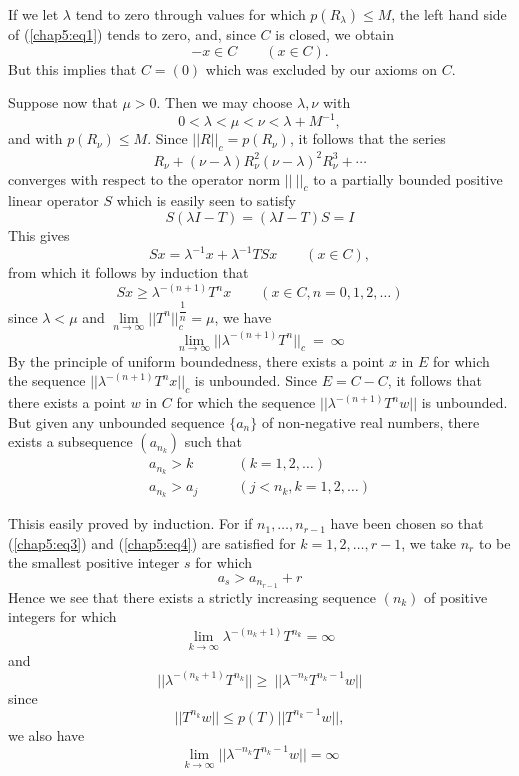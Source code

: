 If we let $\lambda$ tend to zero through values for which $p(R_
\lambda) \leq M$, the left hand side of (\ref{chap5:eq1}) tends to
zero, and, since $C$ is closed, we obtain  
$$
- x \in C \qquad (x \in C).
$$
But this implies that $C=(0)$ which was excluded by our axioms on
$C$. 

Suppose now that $\mu > 0$. Then we may choose $\lambda, \nu$ with 
$$
0 < \lambda < \mu < \nu < \lambda + M^{-1},
$$
and with $p(R_\nu) \leq M$. Since $|| R ||_c = p(R_\nu)$, it follows
that the series 
$$
R_\nu + (\nu - \lambda) R^2_\nu (\nu - \lambda)^2 R^3_\nu + \cdots
$$
converges with respect to the operator norm $||~ ||_c$ to a partially
bounded positive linear operator $S$ which is easily seen to satisfy 
$$
S(\lambda I - T)  = (\lambda I - T) S = I
$$\pageoriginale
This gives
$$
Sx = \lambda^{-1} x + \lambda^{-1} T Sx \qquad (x \in C),
$$
from which it follows by induction that
\begin{equation}
  Sx \geq \lambda^{-(n+1)} T^n x \qquad (x \in C , n = 0, 1, 2,
  \ldots) \tag{2}\label{chap5:eq2} 
\end{equation}
since $\lambda < \mu$ and $ \lim \limits_{n \to \infty} || T^n ||_c^{\dfrac{1}{n}} = \mu $, we have 
$$
\lim_{n \to \infty} || \lambda^{-(n+1)} T^n ||_c ~ = ~ \infty
$$
By the principle of uniform boundedness, there exists a point $x$ in
$E$ for which the sequence $|| \lambda^{-(n+1)} T^n x ||_c$ is
unbounded. Since $E = C - C$, it follows that there exists a point $w$
in $C$ for which the sequence $|| \lambda^{-(n+1)} T^n w ||$ is
unbounded. But given any unbounded sequence $\{ a_n \}$ of
non-negative real numbers, there exists a subsequence $(a_{n_k})$ such
that 
\begin{align*}
  a_{n_k} > k   & \qquad (k = 1, 2, \ldots) \tag{3}\label{chap5:eq3}\\
  a_{n_k} > a_j & \qquad (j < n_k , k = 1, 2, \ldots)
  \tag{4}\label{chap5:eq4} 
\end{align*} 

This\pageoriginale is easily proved by induction. For if $n_1, \ldots , n_{r-1}$
have been chosen so that (\ref{chap5:eq3}) and (\ref{chap5:eq4}) are
satisfied for $k = 1, 2, \ldots , r-1$, we take $n_r$ to be the
smallest positive integer $s$ for which 
$$
a_s > a_{n_{r-1}} + r
$$
Hence we see that there exists a strictly increasing sequence $(n_k)$
of positive integers for which 
\begin{equation*}
  \lim_{k \to \infty} \lambda^{-(n_k + 1)} T^{n_k} = \infty
  \tag{5}\label{chap5:eq5} 
\end{equation*} 
and
\begin{equation*}
  ||\lambda^{-(n_k + 1)} T^{n_k} || \geq ~ || \lambda^{-n_k} T^{n_k -
    1} w|| \tag{6}\label{chap5:eq6}
\end{equation*} 
since
$$
|| T^{n_k} w || \leq p(T) || T^{n_k -1} w ||,
$$
we also have
\begin{equation*}
  \lim_{k \to \infty} || \lambda^{-n_k} T^{n_k - 1} w || = \infty
  \tag{7}\label{chap5:eq7}
\end{equation*} 

